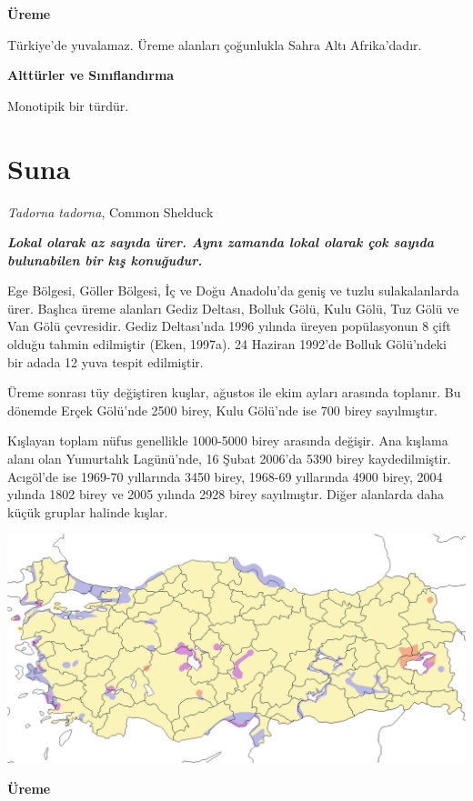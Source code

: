 \documentclass[
  a4paper,
  DIV=11,
  numbers=noendperiod]{scrartcl}
\begin{document}
\textbf{Üreme}

Türkiye'de yuvalamaz. Üreme alanları çoğunlukla Sahra Altı Afrika'dadır.

\textbf{Alttürler ve Sınıflandırma}

Monotipik bir türdür.

\section{Suna}\label{suna}

\emph{Tadorna tadorna}, Common Shelduck

\textbf{\emph{Lokal olarak az sayıda ürer. Aynı zamanda lokal olarak çok
sayıda bulunabilen bir kış konuğudur.}}

Ege Bölgesi, Göller Bölgesi, İç ve Doğu Anadolu'da geniş ve tuzlu
sulakalanlarda ürer. Başlıca üreme alanları Gediz Deltası, Bolluk Gölü,
Kulu Gölü, Tuz Gölü ve Van Gölü çevresidir. Gediz Deltası'nda 1996
yılında üreyen popülasyonun 8 çift olduğu tahmin edilmiştir (Eken,
1997a). 24 Haziran 1992'de Bolluk Gölü'ndeki bir adada 12 yuva tespit
edilmiştir.

Üreme sonrası tüy değiştiren kuşlar, ağustos ile ekim ayları arasında
toplanır. Bu dönemde Erçek Gölü'nde 2500 birey, Kulu Gölü'nde ise 700
birey sayılmıştır.

Kışlayan toplam nüfus genellikle 1000-5000 birey arasında değişir. Ana
kışlama alanı olan Yumurtalık Lagünü'nde, 16 Şubat 2006'da 5390 birey
kaydedilmiştir. Acıgöl'de ise 1969-70 yıllarında 3450 birey, 1968-69
yıllarında 4900 birey, 2004 yılında 1802 birey ve 2005 yılında 2928
birey sayılmıştır. Diğer alanlarda daha küçük gruplar halinde kışlar.

\includegraphics{images/harita_Tadorna tadorna.png}

\textbf{Üreme}
\end{document}
